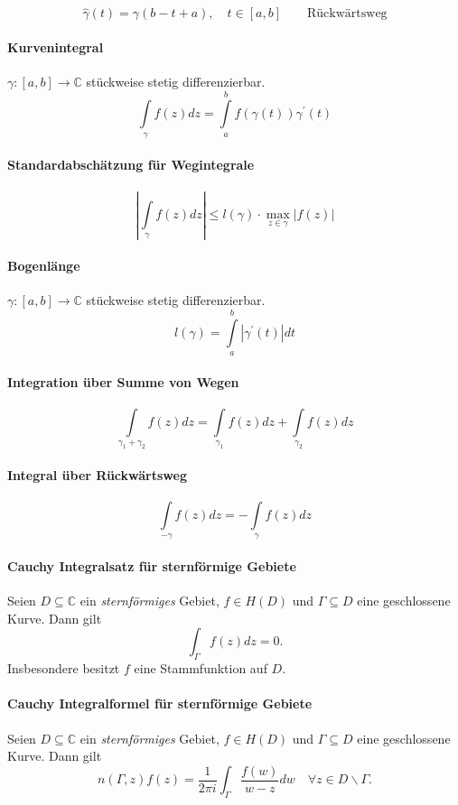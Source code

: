 \documentclass[a4paper, 10pt, DIV20, headings=small]{scrartcl}
\theoremstyle{definition}
\theoremstyle{plain}
\begin{document}
$$\hat{\gamma}(t) = \gamma(b-t+a), \quad t \in [a,b] \qquad \text{Rückwärtsweg}$$

\paragraph{Kurvenintegral}
$\gamma \colon [a,b] \rightarrow \mathbb{C}$ stückweise stetig differenzierbar.
$$\int\limits_{\gamma} f(z) dz = \int\limits_{a}^{b}{f(\gamma(t)) \gamma^\prime(t)}$$

\paragraph{Standardabschätzung für Wegintegrale}
$$\left|\int\limits_{\gamma} f(z) dz \right| \leq l(\gamma) \cdot \max\limits_{z \in \gamma} |f(z)|$$

\paragraph{Bogenlänge}
$\gamma \colon [a,b] \rightarrow \mathbb{C}$ stückweise stetig differenzierbar.
$$l(\gamma) = \int\limits_a^b{|\gamma^\prime (t)| dt}$$

\paragraph{Integration über Summe von Wegen}
$$\int\limits_{\gamma_1 + \gamma_2}f(z) dz = \int\limits_{\gamma_1}f(z) dz + \int\limits_{\gamma_2}f(z) dz$$

\paragraph{Integral über Rückwärtsweg}
$$\int\limits_{-\gamma}f(z)dz = - \int \limits_{\gamma} f(z) dz$$

\paragraph{Cauchy Integralsatz für sternförmige Gebiete}
Seien $D \subseteq \mathbb{C}$ ein \emph{sternförmiges} Gebiet, $f \in H(D)$ und $\Gamma \subseteq D$ eine geschlossene Kurve. Dann gilt
$$\int_\Gamma f(z) dz = 0.$$ Insbesondere besitzt $f$ eine Stammfunktion auf $D$.

\paragraph{Cauchy Integralformel für sternförmige Gebiete}
Seien $D \subseteq \mathbb{C}$ ein \emph{sternförmiges} Gebiet, $f \in H(D)$ und $\Gamma \subseteq D$ eine geschlossene Kurve. Dann gilt
$$n(\Gamma,z)f(z) = \frac{1}{2 \pi i} \int_\Gamma \frac{f(w)}{w-z} dw \quad \forall z \in D \backslash \Gamma.$$
\end{document}
